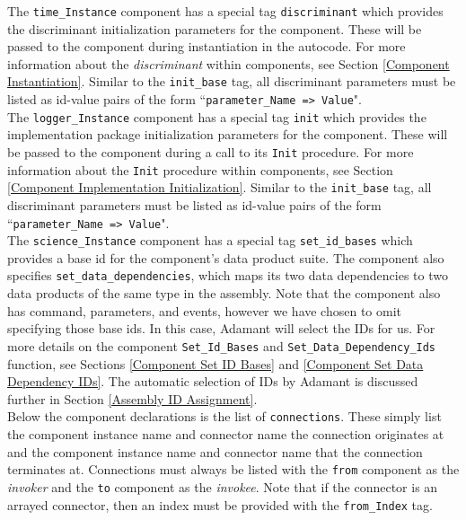 The \texttt{time\_Instance} component has a special tag \texttt{discriminant} which provides the discriminant initialization parameters for the component. These will be passed to the component during instantiation in the autocode. For more information about the \textit{discriminant} within components, see Section \ref{Component Instantiation}. Similar to the \texttt{init\_base} tag, all discriminant parameters must be listed as id-value pairs of the form ``\texttt{parameter\_Name => Value}". \\

The \texttt{logger\_Instance} component has a special tag \texttt{init} which provides the implementation package initialization parameters for the component. These will be passed to the component during a call to its \texttt{Init} procedure. For more information about the \texttt{Init} procedure within components, see Section \ref{Component Implementation Initialization}. Similar to the \texttt{init\_base} tag, all discriminant parameters must be listed as id-value pairs of the form ``\texttt{parameter\_Name => Value}". \\

The \texttt{science\_Instance} component has a special tag \texttt{set\_id\_bases} which provides a base id for the component's data product suite. The component also specifies \texttt{set\_data\_dependencies}, which maps its two data dependencies to two data products of the same type in the assembly. Note that the component also has command, parameters, and events, however we have chosen to omit specifying those base ids. In this case, Adamant will select the IDs for us. For more details on the component \texttt{Set\_Id\_Bases} and \texttt{Set\_Data\_Dependency\_Ids} function, see Sections \ref{Component Set ID Bases} and \ref{Component Set Data Dependency IDs}. The automatic selection of IDs by Adamant is discussed further in Section \ref{Assembly ID Assignment}. \\

Below the component declarations is the list of \texttt{connections}. These simply list the component instance name and connector name the connection originates at and the component instance name and connector name that the connection terminates at. Connections must always be listed with the \texttt{from} component as the \textit{invoker} and the \texttt{to} component as the \textit{invokee}. Note that if the connector is an arrayed connector, then an index must be provided with the \texttt{from\_Index} tag. \\

